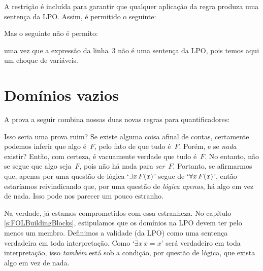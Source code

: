 A restri\c c\~ao \'e inclu\'ida para garantir que qualquer aplica\c c\~ao da regra produza uma senten\c ca da LPO. Assim, \'e permitido o seguinte:

\begin{fitchproof}
	 
	 
\end{fitchproof}
Mas o seguinte  n\~ao \'e permito:
\begin{fitchproof}
	 
\end{fitchproof}
uma vez que a express\~ao da linha~3 n\~ao \'e uma senten\c ca da LPO, pois 
temos aqui um choque de vari\'aveis.

\section{Dom\'inios vazios}
A prova a seguir combina nossas duas novas regras para quantificadores:
	\begin{fitchproof}
	\end{fitchproof}
Isso seria uma prova ruim? Se existe alguma coisa afinal de contas, certamente podemos inferir que algo \'e~$F$, pelo fato de que tudo \'e~$F$. Por\'em, e se \emph{nada} existir? Ent\~ao, com certeza, \'e vacuamente verdade que tudo \'e~$F$. No entanto, n\~ao se segue que algo seja~$F$, pois n\~ao h\'a nada para \emph{ser}~$F$. Portanto, se afirmarmos que, apenas por uma quest\~ao de l\'ogica  `$\exists x\,\mathord{F}(x)$' segue de `$\forall x\,\mathord{F}(x)$', ent\~ao estar\'iamos reivindicando que,   por uma quest\~ao de \emph{l\'ogica apenas}, h\'a algo em vez de nada. Isso pode nos parecer um pouco estranho.

Na verdade,  j\'a estamos comprometidos com essa estranheza. No cap\'itulo \ref{s:FOLBuildingBlocks},  estipulamos que os dom\'inios na LPO devem ter pelo menos um membro. Definimos a validade    (da LPO)  como uma senten\c ca verdadeira em toda interpreta\c c\~ao. Como `$\exists x\, x=x$' ser\'a verdadeiro em toda interpreta\c c\~ao, isso \emph{tamb\'em} est\'a sob a condi\c c\~ao, por quest\~ao de l\'ogica,  que exista algo em vez de nada.

